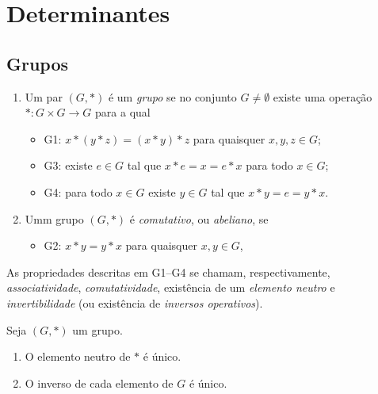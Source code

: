 \chapter{Determinantes}

\section{Grupos}

\begin{definition}[Grupo]
    \leavevmode
        \begin{enumerate}[leftmargin=*, align=left, label=\textbf{(\alph*)}]
            \item Um par $(G, *)$ é um \emph{grupo} se no conjunto $G \neq \emptyset$ existe uma operação $* : G \times G \to G$ para a qual
                \begin{itemize}
                    \item G1:
                        $x * (y * z) = (x * y) * z$
                    para quaisquer $x, y, z \in G$;
                    \item G3: existe $e \in G$ tal que
                        $x * e = x = e * x$
                    para todo $x \in G$;
                    \item G4: para todo $x \in G$ existe $y \in G$ tal que
                        $x * y = e = y * x$.
                \end{itemize}
            \item Umm grupo $(G,*)$ é \emph{comutativo}, ou \emph{abeliano}, se
                \begin{itemize}
                    \item G2: $x * y = y * x$ para quaisquer $x, y \in G$,
                \end{itemize}
        \end{enumerate}
\end{definition}

\begin{remark}
    As propriedades descritas em G1--G4 se chamam, respectivamente, \emph{associatividade}, \emph{comutatividade}, existência de um \emph{elemento neutro} e \emph{invertibilidade} (ou existência de \emph{inversos operativos}). 
\end{remark}

\begin{proposition}
    Seja $(G,*)$ um grupo.
        \begin{enumerate}[leftmargin=*, align=left, label=\textbf{(\alph*)}]
            \item O elemento neutro de $*$ é único.
            \item O inverso de cada elemento de $G$ é único.
        \end{enumerate}
\end{proposition}

